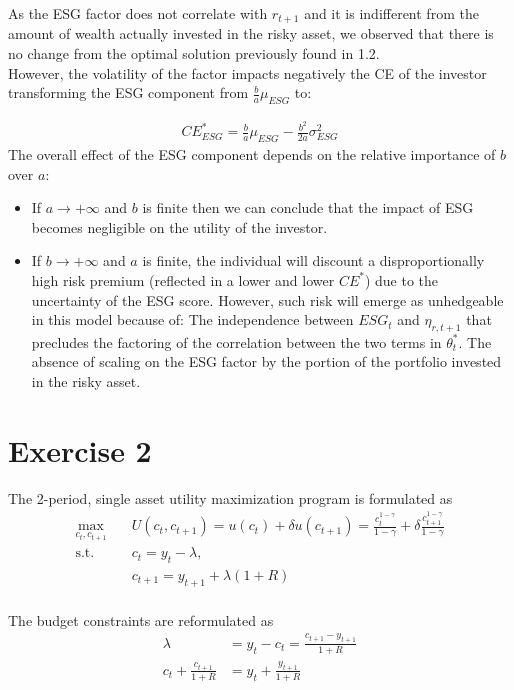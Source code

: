\documentclass[12pt]{article}
\begin{document}
	As the ESG factor does not correlate with $r_{t+1}$ and it is indifferent from the amount of wealth actually invested in the risky asset, we observed that there is no change from the optimal solution previously found in 1.2. \\ However, the volatility of the factor impacts negatively the CE of the investor transforming the ESG component from $\frac{b}{a}\mu_{ESG}$ to: \vspace{-1.5em}
	
	\begin{align}
		CE^*_{ESG} = \frac{b}{a}\mu_{ESG} -\frac{b^2}{2a}\sigma_{ESG}^2
	\end{align}
	The overall effect of the ESG component depends on the relative importance of $b$ over $a$:
	\begin{itemize}
		\item If ${a\to+\infty}$ and $b$ is finite then we can conclude that the impact of ESG becomes negligible on the utility of the investor.
		\item  If ${b\to+\infty}$ and $a$ is finite, the individual will discount a disproportionally high risk premium (reflected in a lower and lower $CE^*$) due to the uncertainty of the ESG score. However, such risk will emerge as unhedgeable in this model because of:
		\subitem The independence between $ESG_t$ and $\eta_{r, t+1}$ that precludes the factoring of the correlation between the two terms in $\theta_{t}^*$.
		\subitem The absence of scaling on the ESG factor by the portion of the portfolio invested in the risky asset. 
	\end{itemize}
	
	\section{Exercise 2}
	The 2-period, single asset utility maximization program is formulated as
	\begin{align*}
		\max_{c_t, c_{t+1}} \quad & U(c_t, c_{t+1}) = u(c_t) + \delta u(c_{t+1}) = \frac{c_t^{1-\gamma}}{1-\gamma} + \delta \frac{c_{t+1}^{1-\gamma}}{1-\gamma}\\
		\textrm{s.t.} \quad & c_t = y_t - \lambda,\\
		\quad & c_{t+1} = y_{t+1} + \lambda (1+R)\\
	\end{align*}
	
	The budget constraints are reformulated as
	\begin{align*}
		\lambda &= y_t - c_t = \frac{c_{t+1} - y_{t+1}}{1+R}\\
		c_t + \frac{c_{t+1}}{1+R} &= y_t + \frac{y_{t+1}}{1+R}
	\end{align*}
	
\end{document}
